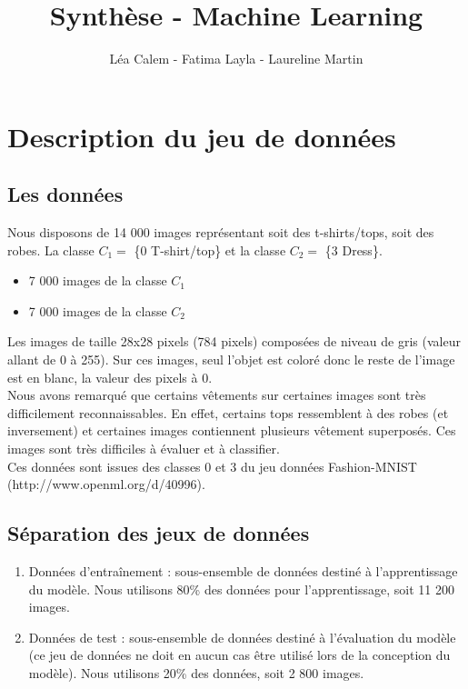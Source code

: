 \documentclass[a4paper,10pt]{article}
\title{Synthèse - Machine Learning}
\author{Léa Calem - Fatima Layla - Laureline Martin}
\begin{document}
\maketitle
	
\section{Description du jeu de données}
	\subsection{Les données}
		Nous disposons de 14 000 images représentant soit des t-shirts/tops, soit des robes. La classe $C_1 =$ \{0 T-shirt/top\} et la classe $C_2 =$ \{3 Dress\}.
		\begin{itemize}
			\item 7 000 images de la classe $C_1$
			\item 7 000 images de la classe $C_2$
		\end{itemize}
		Les images de taille 28x28 pixels (784 pixels) composées de niveau de gris (valeur allant de 0 à 255). Sur ces images, seul l’objet est coloré donc le reste de l’image est en blanc, la valeur des pixels à 0.\\
		Nous avons remarqué que certains vêtements sur certaines images sont très difficilement reconnaissables. En effet, certains tops ressemblent à des robes (et inversement) et certaines images contiennent plusieurs vêtement superposés. Ces images sont très difficiles à évaluer et à classifier.\\
		Ces données sont issues des classes 0 et 3 du jeu données Fashion-MNIST (http://www.openml.org/d/40996). 
	\subsection{Séparation des jeux de données}
		\begin{enumerate}
			\item Données d’entraînement : sous-ensemble de données destiné à l’apprentissage du modèle. Nous utilisons 80\% des données pour l'apprentissage, soit 11 200 images.
			\item Données de test : sous-ensemble de données destiné à l’évaluation du modèle (ce jeu de données ne doit en aucun cas être utilisé lors de la conception du modèle). Nous utilisons 20\% des données, soit 2 800 images.
		\end{enumerate}
\end{document}

